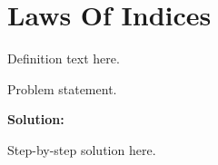 \section{Laws Of Indices}


\begin{definition}[Term]
Definition text here.
\end{definition}

\begin{example}
Problem statement.

\textbf{Solution:}

Step-by-step solution here.
\end{example}

